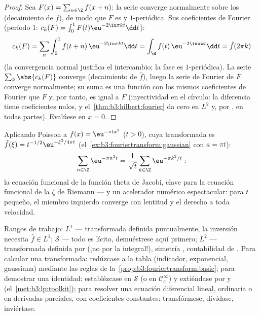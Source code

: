 \begin{proof}
Sea $F(x) = \sum_{n\in\Z}f(x + n)$: la serie converge normalmente sobre
los  (decaimiento de $f$), de
modo que $F$ es  y
$1$-periódica. Sus coeficientes de Fourier (período $1$:
$c_k(F) = \int_0^1F(t)\eu^{-2\iu\pi kt}\dd t$):
\[
c_k(F) = \sum_n\int_0^1 f(t + n)\,\eu^{-2\iu\pi kt}\dd t
= \int_\R f(t)\,\eu^{-2\iu\pi kt}\dd t = \hat f(2\pi k)
\]
(la convergencia normal justifica el intercambio; la fase es
$1$-periódica). La serie $\sum_k\abs{c_k(F)}$ converge (decaimiento de
$\hat f$), luego la serie de Fourier de $F$ converge normalmente; su
suma es una función  con
los mismos coeficientes de Fourier que $F$ y, por tanto, es igual a $F$
(inyectividad en el círculo: la diferencia tiene coeficientes nulos, y
el~\cref{thm:b3:hilbert:fourier} da cero en $L^2$ y, por
, en todas partes).
Evalúese en $x = 0$.
\end{proof}

\begin{example}
\label{ex:b3:fouriertransform:theta}
Aplicando Poisson a $f(x) = \eu^{-\pi tx^2}$ ($t > 0$), cuya
transformada es $\hat f(\xi) = t^{-1/2}\eu^{-\xi^2/4\pi t}$
(el~\cref{ex:b3:fouriertransform:gaussian} con $a = \pi t$):
\[
\sum_{n\in\Z}\eu^{-\pi n^2t}
= \frac1{\sqrt t}\sum_{k\in\Z}\eu^{-\pi k^2/t} :
\]
la ecuación funcional de la función theta de Jacobi, clave para la
ecuación funcional de la $\zeta$ de Riemann --- y un acelerador numérico
espectacular: para $t$ pequeño, el miembro izquierdo converge con
lentitud y el derecho a toda velocidad.
\end{example}

\begin{method}\label{met:b3:fouriertransform:method}
Rangos de trabajo: $L^1$ --- transformada definida puntualmente, la
inversión necesita $\hat f \in L^1$; $\mathcal S$ --- todo es lícito,
demuéstrese aquí primero; $L^2$ --- transformada definida por
 (¡no por la integral!), simetría
, contabilidad de
. Para calcular una
transformada: redúzcase a la tabla (indicador, exponencial, gaussiana)
mediante las reglas de la~\cref{prop:b3:fouriertransform:basic}; para
demostrar una identidad: establézcase en $\mathcal S$ (o en
$\mathcal C_c^\infty$) y extiéndase por
 y
(el~\cref{met:b3:lp:toolkit}); para resolver una ecuación diferencial
lineal, ordinaria o en derivadas parciales, con coeficientes constantes:
transfórmese, divídase, inviértase.
\end{method}

